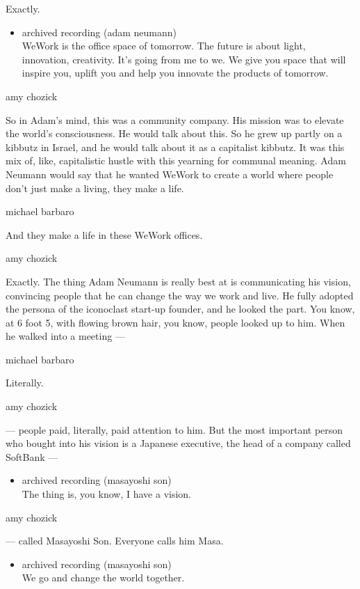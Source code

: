 Exactly.

\begin{itemize}
\tightlist
\item
  archived recording (adam neumann)\\
  WeWork is the office space of tomorrow. The future is about light,
  innovation, creativity. It's going from me to we. We give you space
  that will inspire you, uplift you and help you innovate the products
  of tomorrow.
\end{itemize}

amy chozick

So in Adam's mind, this was a community company. His mission was to
elevate the world's consciousness. He would talk about this. So he grew
up partly on a kibbutz in Israel, and he would talk about it as a
capitalist kibbutz. It was this mix of, like, capitalistic hustle with
this yearning for communal meaning. Adam Neumann would say that he
wanted WeWork to create a world where people don't just make a living,
they make a life.

michael barbaro

And they make a life in these WeWork offices.

amy chozick

Exactly. The thing Adam Neumann is really best at is communicating his
vision, convincing people that he can change the way we work and live.
He fully adopted the persona of the iconoclast start-up founder, and he
looked the part. You know, at 6 foot 5, with flowing brown hair, you
know, people looked up to him. When he walked into a meeting ---

michael barbaro

Literally.

amy chozick

--- people paid, literally, paid attention to him. But the most
important person who bought into his vision is a Japanese executive, the
head of a company called SoftBank ---

\begin{itemize}
\tightlist
\item
  archived recording (masayoshi son)\\
  The thing is, you know, I have a vision.
\end{itemize}

amy chozick

--- called Masayoshi Son. Everyone calls him Masa.

\begin{itemize}
\tightlist
\item
  archived recording (masayoshi son)\\
  We go and change the world together.
\end{itemize}

